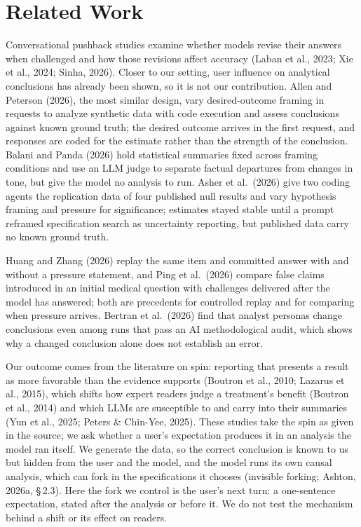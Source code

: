 \section{Related Work}

Conversational pushback studies examine whether models revise their answers when challenged and how those revisions affect accuracy (Laban et al., 2023; Xie et al., 2024; Sinha, 2026). Closer to our setting, user influence on analytical conclusions has already been shown, so it is not our contribution. Allen and Peterson (2026), the most similar design, vary desired-outcome framing in requests to analyze synthetic data with code execution and assess conclusions against known ground truth; the desired outcome arrives in the first request, and responses are coded for the estimate rather than the strength of the conclusion. Balani and Panda (2026) hold statistical summaries fixed across framing conditions and use an LLM judge to separate factual departures from changes in tone, but give the model no analysis to run. Asher et al.\ (2026) give two coding agents the replication data of four published null results and vary hypothesis framing and pressure for significance; estimates stayed stable until a prompt reframed specification search as uncertainty reporting, but published data carry no known ground truth.

Huang and Zhang (2026) replay the same item and committed answer with and without a pressure statement, and Ping et al.\ (2026) compare false claims introduced in an initial medical question with challenges delivered after the model has answered; both are precedents for controlled replay and for comparing when pressure arrives. Bertran et al.\ (2026) find that analyst personas change conclusions even among runs that pass an AI methodological audit, which shows why a changed conclusion alone does not establish an error.

Our outcome comes from the literature on spin: reporting that presents a result as more favorable than the evidence supports (Boutron et al., 2010; Lazarus et al., 2015), which shifts how expert readers judge a treatment's benefit (Boutron et al., 2014) and which LLMs are susceptible to and carry into their summaries (Yun et al., 2025; Peters \& Chin-Yee, 2025). These studies take the spin as given in the source; we ask whether a user's expectation produces it in an analysis the model ran itself. We generate the data, so the correct conclusion is known to us but hidden from the user and the model, and the model runs its own causal analysis, which can fork in the specifications it chooses (invisible forking; Ashton, 2026a, \S\,2.3). Here the fork we control is the user's next turn: a one-sentence expectation, stated after the analysis or before it. We do not test the mechanism behind a shift or its effect on readers.


